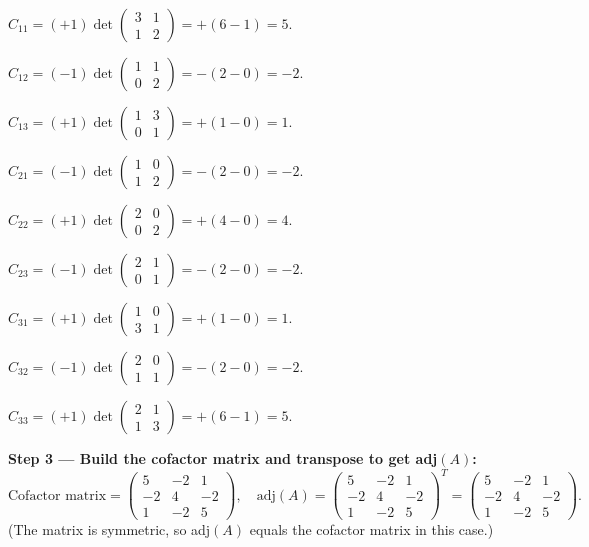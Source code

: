 \documentclass[12pt,a4paper]{article}
\begin{document}
$C_{11} = (+1)\det\begin{pmatrix}3&1\\1&2\end{pmatrix} = +(6-1) = 5$.

$C_{12} = (-1)\det\begin{pmatrix}1&1\\0&2\end{pmatrix} = -(2-0) = -2$.

$C_{13} = (+1)\det\begin{pmatrix}1&3\\0&1\end{pmatrix} = +(1-0) = 1$.

$C_{21} = (-1)\det\begin{pmatrix}1&0\\1&2\end{pmatrix} = -(2-0) = -2$.

$C_{22} = (+1)\det\begin{pmatrix}2&0\\0&2\end{pmatrix} = +(4-0) = 4$.

$C_{23} = (-1)\det\begin{pmatrix}2&1\\0&1\end{pmatrix} = -(2-0) = -2$.

$C_{31} = (+1)\det\begin{pmatrix}1&0\\3&1\end{pmatrix} = +(1-0) = 1$.

$C_{32} = (-1)\det\begin{pmatrix}2&0\\1&1\end{pmatrix} = -(2-0) = -2$.

$C_{33} = (+1)\det\begin{pmatrix}2&1\\1&3\end{pmatrix} = +(6-1) = 5$.

\textbf{Step 3 --- Build the cofactor matrix and transpose to get adj$(A)$:}
\[
\text{Cofactor matrix} = \begin{pmatrix} 5 & -2 & 1 \\ -2 & 4 & -2 \\ 1 & -2 & 5 \end{pmatrix},
\quad
\text{adj}(A) = \begin{pmatrix} 5 & -2 & 1 \\ -2 & 4 & -2 \\ 1 & -2 & 5 \end{pmatrix}^T = \begin{pmatrix} 5 & -2 & 1 \\ -2 & 4 & -2 \\ 1 & -2 & 5 \end{pmatrix}.
\]
(The matrix is symmetric, so adj$(A)$ equals the cofactor matrix in this case.)
\end{document}
